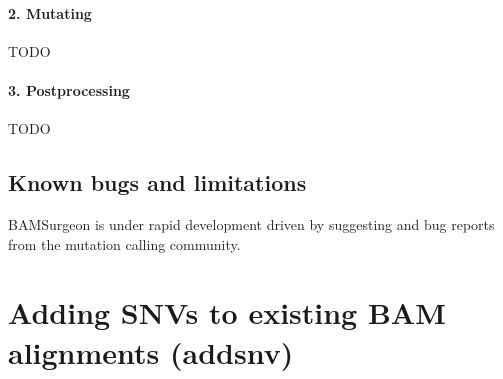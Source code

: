 \documentclass[letterpaper,11pt]{article}
\begin{document}
\paragraph{2. Mutating}
TODO

\paragraph{3. Postprocessing}
TODO

\subsection{Known bugs and limitations}
BAMSurgeon is under rapid development driven by suggesting and bug reports from the mutation calling community.



\section{Adding SNVs to existing BAM alignments (addsnv)}
\end{document}
